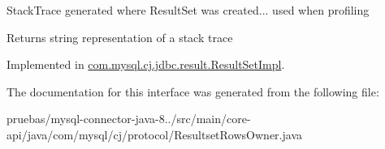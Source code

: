 Stack\+Trace generated where Result\+Set was created... used when profiling

\begin{DoxyReturn}{Returns}
string representation of a stack trace 
\end{DoxyReturn}


Implemented in \mbox{\hyperlink{classcom_1_1mysql_1_1cj_1_1jdbc_1_1result_1_1_result_set_impl_acc4c2166c7861185dcae5b467bc557ec}{com.\+mysql.\+cj.\+jdbc.\+result.\+Result\+Set\+Impl}}.



The documentation for this interface was generated from the following file\+:\begin{DoxyCompactItemize}
\item 
pruebas/mysql-\/connector-\/java-\/8../src/main/core-\/api/java/com/mysql/cj/protocol/Resultset\+Rows\+Owner.\+java\end{DoxyCompactItemize}

